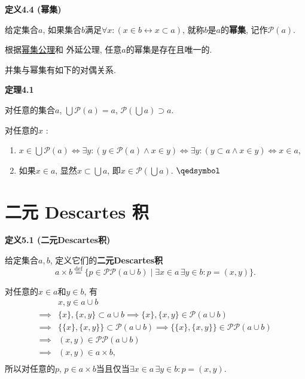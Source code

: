 \documentclass[UTF8]{ctexart}
\begin{document}
\vspace{10pt}

\hypertarget{sec:定义4.4}{}
\noindent\textbf{定义4.4 (幂集)}

给定集合$a$, 如果集合$b$满足$\forall x:(x\in b\leftrightarrow x\subset a)$,
就称$b$是$a$的\textbf{幂集}, 记作$\mathcal{P}(a)$.

根据\href{../01 ZFC 公理/01 ZFC 公理#nameddest=sec:幂集公理}{幂集公理}和
外延公理, 任意$a$的幂集是存在且唯一的.

\vspace{10pt}

并集与幂集有如下的对偶关系.

\vspace{10pt}

\hypertarget{sec:定理4.1}{}
\noindent\textbf{定理4.1}

对任意的集合$a$, $\displaystyle\bigcup\mathcal{P}(a)=a$,
$\displaystyle\mathcal{P}\left(\bigcup a\right)\supset a$.


对任意的$x$ :

\begin{enumerate}
    \item $\displaystyle x\in\bigcup\mathcal{P}(a)\iff
    \exists y:(y\in\mathcal{P}(a)\land x\in y)\iff
    \exists y:(y\subset a\land x\in y)\iff x\in a$,
    \item 如果$x\in a$, 显然$\displaystyle x\subset\bigcup a$,
    即$\displaystyle x\in\mathcal{P}\left(\bigcup a\right)$. \hfill $\qedsymbol$
\end{enumerate}





\newpage

\section{二元 Descartes 积}

\hypertarget{sec:定义5.1}{}
\noindent\textbf{定义5.1 (二元Descartes积)}

给定集合$a,b$, 定义它们的\textbf{二元Descartes积}
\[
    a\times b\overset{\mathrm{def}}{=}\{p\in\mathcal{P}\mathcal{P}(a\cup b)
    \mid\exists x\in a\,\exists y\in b:p=(x,y)\}.
\]

\vspace{10pt}

对任意的$x\in a$和$y\in b$, 有
\[\begin{aligned}
    &x,y\in a\cup b\\
    \implies&\{x\},\{x,y\}\subset a\cup b
    \implies\{x\},\{x,y\}\in\mathcal{P}(a\cup b)\\
    \implies&\{\{x\},\{x,y\}\}\subset\mathcal{P}(a\cup b)
    \implies\{\{x\},\{x,y\}\}\in\mathcal{P}\mathcal{P}(a\cup b)\\
    \implies&(x,y)\in\mathcal{P}\mathcal{P}(a\cup b)\\
    \implies&(x,y)\in a\times b,\\[3pt]
\end{aligned}\]
所以对任意的$p$, $p\in a\times b$当且仅当$\exists x\in a\,\exists y\in b:p=(x,y)$.
\end{document}
